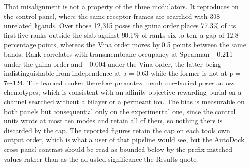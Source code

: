 That misalignment is not a property of the three modulators. It reproduces on the control panel, where the same receptor frames are searched with 308 unrelated ligands. Over those 12,315 poses the gnina order places 77.3\% of its first five ranks outside the slab against 90.1\% of ranks six to ten, a gap of 12.8 percentage points, whereas the Vina order moves by 0.5 points between the same bands. Rank correlates with transmembrane occupancy at Spearman \ensuremath{-}0.211 under the gnina order and \ensuremath{-}0.004 under the Vina order, the latter being indistinguishable from independence at p = 0.63 while the former is not at p = 7e-124. The learned ranker therefore promotes membrane-buried poses across chemotypes, which is consistent with an affinity objective rewarding burial on a channel searched without a bilayer or a permeant ion. The bias is measurable on both panels but consequential only on the experimental one, since the control units wrote at most ten modes and retain all of them, so nothing there is discarded by the cap. The reported figures retain the cap on each tool\textquotesingle s own output order, which is what a user of that pipeline would see, but the AutoDock cross-panel contrast should be read as bounded below by the prefix-matched values rather than as the adjusted significance the Results quote.

